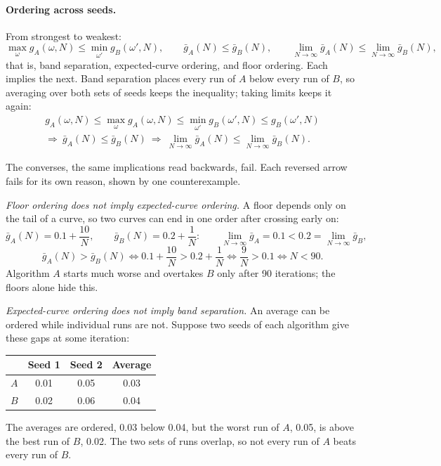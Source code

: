\documentclass[11pt]{article}
\begin{document}
\paragraph{Ordering across seeds.} From strongest to weakest:
\[
  \max_{\omega} g_A(\omega, N) \le \min_{\omega'} g_B(\omega', N), \qquad
  \bar g_A(N) \le \bar g_B(N), \qquad
  \lim_{N \to \infty} \bar g_A(N) \le \lim_{N \to \infty} \bar g_B(N),
\]
that is, band separation, expected-curve ordering, and floor ordering. Each implies the next. Band
separation places every run of $A$ below every run of $B$, so averaging over both sets of seeds keeps
the inequality; taking limits keeps it again:
\begin{gather*}
  g_A(\omega, N) \le \max_{\omega} g_A(\omega, N) \le \min_{\omega'} g_B(\omega', N)
    \le g_B(\omega', N) \\
  \Longrightarrow\ \bar g_A(N) \le \bar g_B(N)
  \ \Longrightarrow\ \lim_{N \to \infty} \bar g_A(N) \le \lim_{N \to \infty} \bar g_B(N).
\end{gather*}

The converses, the same implications read backwards, fail. Each reversed arrow fails for its own
reason, shown by one counterexample.

\emph{Floor ordering does not imply expected-curve ordering.} A floor depends only on the tail of a
curve, so two curves can end in one order after crossing early on:
\[
  \bar g_A(N) = 0.1 + \frac{10}{N}, \qquad \bar g_B(N) = 0.2 + \frac{1}{N}: \qquad
  \lim_{N \to \infty} \bar g_A = 0.1 < 0.2 = \lim_{N \to \infty} \bar g_B ,
\]
\[
  \bar g_A(N) > \bar g_B(N) \iff 0.1 + \frac{10}{N} > 0.2 + \frac{1}{N}
  \iff \frac{9}{N} > 0.1 \iff N < 90 .
\]
Algorithm $A$ starts much worse and overtakes $B$ only after 90 iterations; the floors alone hide
this.

\emph{Expected-curve ordering does not imply band separation.} An average can be ordered while
individual runs are not. Suppose two seeds of each algorithm give these gaps at some iteration:
\begin{center}
  \begin{tabular}{lccc}
    \toprule
      & Seed 1 & Seed 2 & Average \\
    \midrule
    $A$ & 0.01 & 0.05 & 0.03 \\
    $B$ & 0.02 & 0.06 & 0.04 \\
    \bottomrule
  \end{tabular}
\end{center}
The averages are ordered, 0.03 below 0.04, but the worst run of $A$, 0.05, is above the best run of
$B$, 0.02. The two sets of runs overlap, so not every run of $A$ beats every run of $B$.
\end{document}
